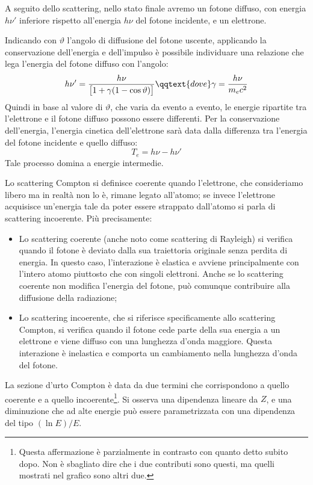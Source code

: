 A seguito dello scattering, nello stato finale avremo un fotone diffuso, con energia $h\nu'$ inferiore rispetto all'energia $h\nu$ del fotone incidente, e un elettrone.

Indicando con $\vartheta$ l'angolo di diffusione del fotone uscente, applicando la conservazione dell'energia e dell'impulso è possibile individuare una relazione che lega l'energia del fotone diffuso con l'angolo:
\begin{equation*}
    h\nu'=\frac{h\nu}{\big[1 + \gamma (1 - \cos{\vartheta})\big]}
    \qqtext{dove}
    \gamma=\frac{h\nu}{m_ec^2}
\end{equation*}
Quindi in base al valore di $\vartheta$, che varia da evento a evento, le energie ripartite tra l'elettrone e il fotone diffuso possono essere differenti.
Per la conservazione dell'energia, l'energia cinetica dell'elettrone sarà data dalla differenza tra l'energia del fotone incidente e quello diffuso:
\begin{equation*}
    T_e=h\nu - h\nu'
\end{equation*}
Tale processo domina a energie intermedie.

Lo scattering Compton si definisce coerente quando l'elettrone, che consideriamo libero ma in realtà non lo è, rimane legato all'atomo; se invece l'elettrone acquisisce un'energia tale da poter essere strappato dall'atomo si parla di scattering incoerente. Più precisamente:

\begin{itemize}[leftmargin=0.5cm]
    \item Lo scattering coerente (anche noto come scattering di Rayleigh) si verifica quando il fotone è deviato dalla sua traiettoria originale senza perdita di energia. In questo caso, l'interazione è elastica e avviene principalmente con l'intero atomo piuttosto che con singoli elettroni. Anche se lo scattering coerente non modifica l'energia del fotone, può comunque contribuire alla diffusione della radiazione;
    \item Lo scattering incoerente, che si riferisce specificamente allo scattering Compton, si verifica quando il fotone cede parte della sua energia a un elettrone e viene diffuso con una lunghezza d'onda maggiore. Questa interazione è inelastica e comporta un cambiamento nella lunghezza d'onda del fotone.
\end{itemize}

La sezione d'urto Compton è data da due termini che corrispondono a quello coerente e a quello incoerente\footnote{Questa affermazione è parzialmente in contrasto con quanto detto subito dopo. Non è sbagliato dire che i due contributi sono questi, ma quelli mostrati nel grafico sono altri due.}. Si osserva una dipendenza lineare da $Z$, e una diminuzione che ad alte energie può essere parametrizzata con una dipendenza del tipo $(\ln E)/E$.

